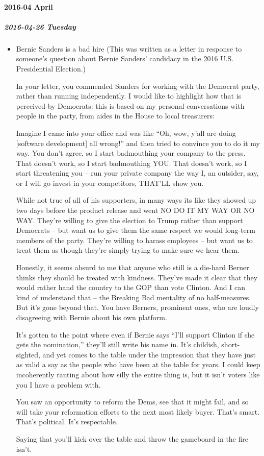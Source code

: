 \documentclass[11pt]{article}
\begin{document}
\paragraph*{2016-04 April}
\label{sec:orgea5bc35}
\startcontents[level-4]
\subparagraph*{2016-04-26 Tuesday}
\label{sec:org3bf233d}
\begin{itemize}
\item Bernie Sanders is a bad hire
\label{sec:orgd433562}
(This was written as a letter in response to someone's question about Bernie Sanders' candidacy in the 2016 U.S. Presidential Election.)

In your letter, you commended Sanders for working with the Democrat party, rather than running independently. I would like to highlight how that is perceived by Democrats: this is based on my personal conversations with people in the party, from aides in the House to local treasurers:

Imagine I came into your office and was like “Oh, wow, y’all are doing [software development] all wrong!” and then tried to convince you to do it my way. You don’t agree, so I start badmouthing your company to the press. That doesn’t work, so I start badmouthing YOU. That doesn’t work, so I start threatening you – run your private company the way I, an outsider, say, or I will go invest in your competitors, THAT’LL show you.

While not true of all of his supporters, in many ways its like they showed up two days before the product release and went NO DO IT MY WAY OR NO WAY. They’re willing to give the election to Trump rather than support Democrats – but want us to give them the same respect we would long-term members of the party. They’re willing to harass employees – but want us to treat them as though they’re simply trying to make sure we hear them.

Honestly, it seems absurd to me that anyone who still is a die-hard Berner thinks they should be treated with kindness. They’ve made it clear that they would rather hand the country to the GOP than vote Clinton. And I can kind of understand that – the Breaking Bad mentality of no half-measures. But it’s gone beyond that. You have Berners, prominent ones, who are loudly disagreeing with Bernie about his own platform.

It’s gotten to the point where even if Bernie says “I’ll support Clinton if she gets the nomination,” they’ll still write his name in. It’s childish, short-sighted, and yet comes to the table under the impression that they have just as valid a say as the people who have been at the table for years. I could keep incoherently ranting about how silly the entire thing is, but it isn’t voters like you I have a problem with.

You saw an opportunity to reform the Dems, see that it might fail, and so will take your reformation efforts to the next most likely buyer. That’s smart. That’s political. It’s respectable.

Saying that you’ll kick over the table and throw the gameboard in the fire isn’t.
\end{itemize}
\end{document}
